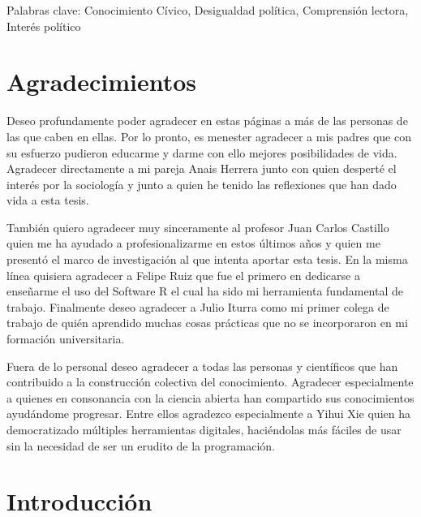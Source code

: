 \documentclass[12pt,twoside]{templates/facsothesis}
\begin{document}
Palabras clave: Conocimiento Cívico, Desigualdad política, Comprensión lectora, Interés político

\hypertarget{agradecimientos}{%
\chapter*{Agradecimientos}\label{agradecimientos}}

Deseo profundamente poder agradecer en estas páginas a más de las personas de las que caben en ellas. Por lo pronto, es menester agradecer a mis padres que con su esfuerzo pudieron educarme y darme con ello mejores posibilidades de vida.
Agradecer directamente a mi pareja Anais Herrera junto con quien desperté el interés por la sociología y junto a quien he tenido las reflexiones que han dado vida a esta tesis.

También quiero agradecer muy sinceramente al profesor Juan Carlos Castillo quien me ha ayudado a profesionalizarme en estos últimos años y quien me presentó el marco de investigación al que intenta aportar esta tesis. En la misma línea quisiera agradecer a Felipe Ruiz que fue el primero en dedicarse a enseñarme el uso del Software R el cual ha sido mi herramienta fundamental de trabajo. Finalmente deseo agradecer a Julio Iturra como mi primer colega de trabajo de quién aprendido muchas cosas prácticas que no se incorporaron en mi formación universitaria.

Fuera de lo personal deseo agradecer a todas las personas y científicos que han contribuido a la construcción colectiva del conocimiento. Agradecer especialmente a quienes en consonancia con la ciencia abierta han compartido sus conocimientos ayudándome progresar. Entre ellos agradezco especialmente a Yihui Xie quien ha democratizado múltiples herramientas digitales, haciéndolas más fáciles de usar sin la necesidad de ser un erudito de la programación.

\hypertarget{introducciuxf3n}{%
\chapter{Introducción}\label{introducciuxf3n}}
\end{document}

